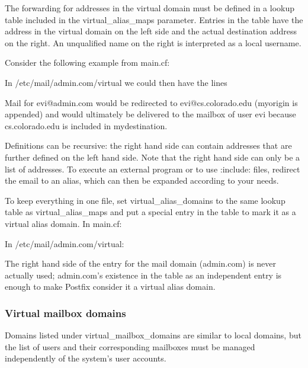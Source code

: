 The forwarding for addresses in the virtual domain must be defined in a
lookup table included in the {virtual\_alias\_maps} parameter. Entries
in the table have the address in the virtual domain on the left side and
the actual destination address on the right. An unqualified name on the
right is interpreted as a local username.

Consider the following example from {main.cf}:


In {/etc/mail/admin.com/virtual} we could then have the lines


Mail for evi@admin.com would be redirected to evi@cs.colorado.edu
({myorigin} is appended) and would ultimately be delivered to the
mailbox of user evi because cs.colorado.edu is included in
{mydestination}.

Definitions can be recursive: the right hand side can contain addresses
that are further defined on the left hand side. Note that the right hand
side can only be a list of addresses. To execute an external program or
to use {:include:} files, redirect the email to an alias, which can then
be expanded according to your needs.

To keep everything in one file, set {virtual\_alias\_domains} to the
same lookup table as {virtual\_alias\_maps} and put a special entry in
the table to mark it as a virtual alias domain. In
{main.cf}:\protect\hypertarget{part0026_split_062.htmlux5cux23_idIndexMarker2724}{}{}


In {/etc/mail/admin.com/virtual}:


The right hand side of the entry for the mail domain (admin.com) is
never actually used; admin.com's existence in the table as an
independent entry is enough to make Postfix consider it a virtual alias
domain.

\subsubsection[Virtual mailbox
domains]{\texorpdfstring{\protect\hypertarget{part0026_split_062.htmlux5cux23_idTextAnchor1186}{}{}Virtual
mailbox domains}{Virtual mailbox domains}}

Domains listed under {virtual\_mailbox\_domains} are similar to local
domains, but the list of users and their corresponding mailboxes must be
managed independently of the system's user accounts.


